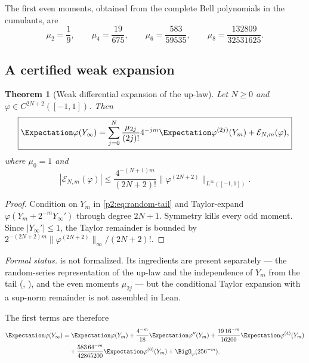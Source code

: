\documentclass[11pt,oneside]{article}
\numberwithin{equation}{section}
\newtheorem{theorem}{Theorem}[section]
\theoremstyle{definition}
\theoremstyle{remark}
\begin{document}
The first even moments, obtained from the complete Bell polynomials in the cumulants, are
\begin{equation}
 \mu_2=\frac19,\qquad
 \mu_4=\frac{19}{675},\qquad
 \mu_6=\frac{583}{59535},\qquad
 \mu_8=\frac{132809}{32531625}.
 \label{p2:eq:moments-first}
\end{equation}

\subsection{A certified weak expansion}

\begin{theorem}[Weak differential expansion of the up-law]
\label{p2:thm:weak-expansion}
Let $N\ge0$ and $\varphi\in C^{2N+2}([-1,1])$.  Then
\begin{equation}
 \boxed{
 \Expectation\varphi(Y_\infty)
 =\sum_{j=0}^{N}\frac{\mu_{2j}}{(2j)!}4^{-jm}
   \Expectation\varphi^{(2j)}(Y_m)+\mathcal E_{N,m}(\varphi),}
 \label{p2:eq:weak-expansion}
\end{equation}
where $\mu_0=1$ and
\begin{equation}
 \boxed{
 |\mathcal E_{N,m}(\varphi)|
 \le\frac{4^{-(N+1)m}}{(2N+2)!}
 \|\varphi^{(2N+2)}\|_{L^\infty([-1,1])}.}
 \label{p2:eq:weak-bound}
\end{equation}
\newresult
\end{theorem}

\begin{proof}
Condition on $Y_m$ in \eqref{p2:eq:random-tail} and Taylor-expand
$\varphi(Y_m+2^{-m}Y_\infty')$ through degree $2N+1$.  Symmetry kills every odd moment.
Since $|Y_\infty'|\le1$, the Taylor remainder is bounded by
$2^{-(2N+2)m}\|\varphi^{(2N+2)}\|_\infty/(2N+2)!$.
\end{proof}

\emph{Formal status.}   is not formalized.  Its ingredients are
present separately --- the random-series representation of the up-law and the independence
of $Y_m$ from the tail (, ),
and the even moments $\mu_{2j}$ --- but the conditional Taylor expansion with a sup-norm
remainder is not assembled in Lean.

The first terms are therefore
\begin{align}
 \Expectation\varphi(Y_\infty)
 &=\Expectation\varphi(Y_m)
 +\frac{4^{-m}}{18}\Expectation\varphi''(Y_m)
 +\frac{19\,16^{-m}}{16200}\Expectation\varphi^{(4)}(Y_m)
 \notag\\
 &\quad
 +\frac{583\,64^{-m}}{42865200}\Expectation\varphi^{(6)}(Y_m)
 +\BigO_\varphi(256^{-m}).
 \label{p2:eq:weak-first}
\end{align}
\end{document}

